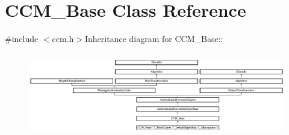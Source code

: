 \hypertarget{class_c_c_m___base}{
\section{CCM\_\-Base Class Reference}
\label{class_c_c_m___base}
}


 


{\ttfamily \#include $<$ccm.h$>$}Inheritance diagram for CCM\_\-Base::\begin{figure}[H]
\begin{center}
\leavevmode
\includegraphics[height=3.67816cm]{class_c_c_m___base}
\end{center}
\end{figure}
